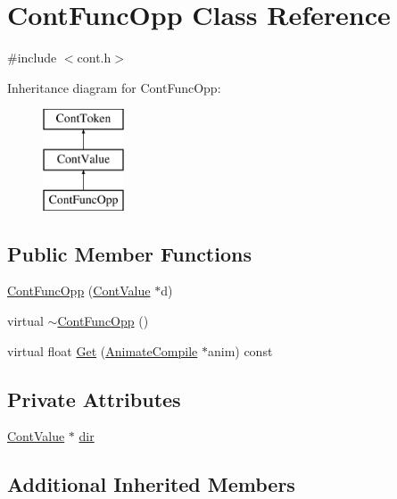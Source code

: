 \hypertarget{a00057}{\section{Cont\-Func\-Opp Class Reference}
\label{a00057}
}


{\ttfamily \#include $<$cont.\-h$>$}

Inheritance diagram for Cont\-Func\-Opp\-:\begin{figure}[H]
\begin{center}
\leavevmode
\includegraphics[height=3.000000cm]{a00057}
\end{center}
\end{figure}
\subsection*{Public Member Functions}
\begin{DoxyCompactItemize}
\item 
\hyperlink{a00057_a85b475a28af7b4af6c36880bce631cd5}{Cont\-Func\-Opp} (\hyperlink{a00086}{Cont\-Value} $\ast$d)
\item 
virtual \hyperlink{a00057_a4796c527230cbd0a04ecf252638db445}{$\sim$\-Cont\-Func\-Opp} ()
\item 
virtual float \hyperlink{a00057_adb4821819f197ecb965b7254660652e3}{Get} (\hyperlink{a00007}{Animate\-Compile} $\ast$anim) const 
\end{DoxyCompactItemize}
\subsection*{Private Attributes}
\begin{DoxyCompactItemize}
\item 
\hyperlink{a00086}{Cont\-Value} $\ast$ \hyperlink{a00057_ae5a5be8f69b24e66e27c07368ada1024}{dir}
\end{DoxyCompactItemize}
\subsection*{Additional Inherited Members}


